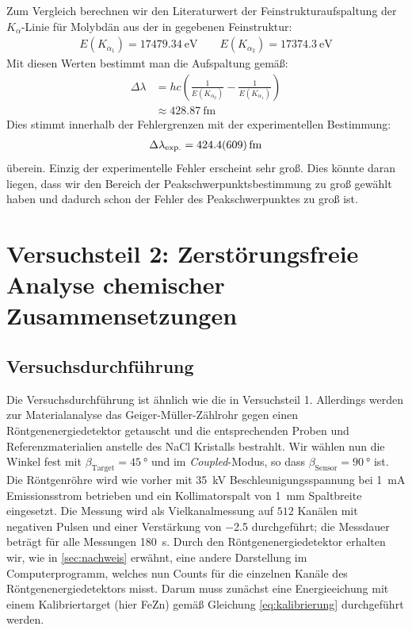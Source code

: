 \documentclass[11pt, a4paper]{article}
\begin{document}
Zum Vergleich berechnen wir den Literaturwert der Feinstrukturaufspaltung der $K_\alpha$-Linie für Molybdän aus der in \cite{booklet} gegebenen Feinstruktur:
\begin{align*}
  E(K_{\alpha_1}) = \SI{17479,34}{\electronvolt} \qquad E(K_{\alpha_2}) = \SI{17374,3}{\electronvolt}
\end{align*}
Mit diesen Werten bestimmt man die Aufspaltung gemäß:
\begin{align*}
  \Delta \lambda &= h c \left( \frac{1}{E(K_{\alpha_2})} - \frac{1}{E(K_{\alpha_1})} \right) \\
  &\approx \SI{428,87}{\femto\metre}
\end{align*}
Dies stimmt innerhalb der Fehlergrenzen mit der experimentellen Bestimmung:
\begin{align*}
  \Delta \lambda_\mathrm{exp.} = \SI{424,4+-60,9}{\femto\metre}
\end{align*}
überein.
Einzig der experimentelle Fehler erscheint sehr groß.
Dies könnte daran liegen, dass wir den Bereich der Peakschwerpunktsbestimmung zu groß gewählt haben und dadurch schon der Fehler des Peakschwerpunktes zu groß ist.


\section{Versuchsteil 2: Zerstörungsfreie Analyse chemischer Zusammensetzungen}

\subsection{Versuchsdurchführung}
Die Versuchsdurchführung ist ähnlich wie die in Versuchsteil 1.
Allerdings werden zur Materialanalyse das Geiger-Müller-Zählrohr gegen einen Röntgenenergiedetektor getauscht und die entsprechenden Proben und Referenzmaterialien anstelle des NaCl Kristalls bestrahlt.
Wir wählen nun die Winkel fest mit $\beta_\mathrm{Target}=\SI{45}{\degree}$ und im \emph{Coupled}-Modus, so dass $\beta_\mathrm{Sensor} = \SI{90}{\degree}$ ist.
Die Röntgenröhre wird wie vorher mit \SI{35}{\kilo\volt} Beschleunigungsspannung bei \SI{1}{\milli\ampere} Emissionsstrom betrieben und ein Kollimatorspalt von \SI{1}{\milli\metre} Spaltbreite eingesetzt.
Die Messung wird als Vielkanalmessung auf $512$ Kanälen mit negativen Pulsen und einer Verstärkung von \num{-2.5} durchgeführt; die Messdauer beträgt für alle Messungen \SI{180}{\second}.
Durch den Röntgenenergiedetektor erhalten wir, wie in \ref{sec:nachweis} erwähnt, eine andere Darstellung im Computerprogramm, welches nun Counts für die einzelnen Kanäle des Röntgenenergiedetektors misst. Darum muss zunächst eine Energieeichung mit einem Kalibriertarget (hier FeZn) gemäß Gleichung \ref{eq:kalibrierung} durchgeführt werden.
\end{document}
